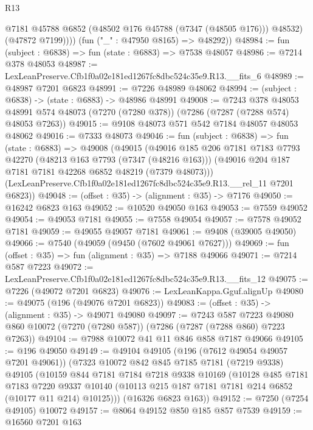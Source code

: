 \begin{lexlean}{R13}
\begin{coremodule}
              @7181
              @45788
              @6852
              (@48502 @176 @45788 (@7347 (@48505 @176)))
              @48532)
            (@47872 @7199))))
      (fun ("_" : @47950 @8165) => @48292))
@48984 := fun (subject : @6838) => fun (state : @6883) => @7538 @48057
@48986 := @7214 @378 @48053
@48987 := LexLeanPreserve.Cfb1f0a02e181ed1267fc8dbc524c35e9.R13.__fits_6
@48989 := @48987 @7201 @6823
@48991 := @7226 @48989 @48062
@48994 := (subject : @6838) -> (state : @6883) -> @48986 @48991
@49008 := @7243
    @378
    @48053
    @48991
    @574
    @48073
    (@7270 (@7280 @378))
    (@7286 (@7287 (@7288 @574) @48053 @7263))
@49015 := @9108 @48073 @571 @542 @7184 @48057 @48053 @48062
@49016 := @7333 @48073
@49046 := fun (subject : @6838) =>
  fun (state : @6883) =>
  @49008
    (@49015
      (@49016
        @185
        @206
        @7181
        @7183
        @7793
        @42270
        (@48213 @163 @7793 (@7347 (@48216 @163)))
        (@49016 @204 @187 @7181 @7181 @42268 @6852 @48219 (@7379 @48073)))
      (LexLeanPreserve.Cfb1f0a02e181ed1267fc8dbc524c35e9.R13.__rel_11 @7201 @6823))
@49048 := (offset : @35) -> (alignment : @35) -> @7176
@49050 := @16242 @6823 @163
@49052 := @10520 @49050 @163
@49053 := @7559 @49052
@49054 := @49053 @7181
@49055 := @7558 @49054
@49057 := @7578 @49052 @7181
@49059 := @49055 @49057 @7181
@49061 := @9408 (@39005 @49050)
@49066 := @7540 (@49059 (@9450 (@7602 @49061 @7627)))
@49069 := fun (offset : @35) => fun (alignment : @35) => @7188 @49066
@49071 := @7214 @587 @7223
@49072 := LexLeanPreserve.Cfb1f0a02e181ed1267fc8dbc524c35e9.R13.__fits_12
@49075 := @7226 (@49072 @7201 @6823)
@49076 := LexLeanKappa.Gguf.alignUp
@49080 := @49075 (@196 (@49076 @7201 @6823))
@49083 := (offset : @35) -> (alignment : @35) -> @49071 @49080
@49097 := @7243
    @587
    @7223
    @49080
    @860
    @10072
    (@7270 (@7280 @587))
    (@7286 (@7287 (@7288 @860) @7223 @7263))
@49104 := @7988 @10072 @41 @11 @846 @858 @7187 @49066
@49105 := @196 @49050
@49149 := @49104
    @49105
    (@196 (@7612 @49054 @49057 @7201 @49061))
    (@7323
      @10072
      @842
      @845
      @7185
      @7181
      (@7219 @9338)
      @49105
      (@10159
        @844
        @7181
        @7184
        @7218
        @9338
        @10169
        (@10128
          @485
          @7181
          @7183
          @7220
          @9337
          @10140
          (@10113 @215 @187 @7181 @7181 @214 @6852 (@10177 @11 @214) @10125)))
      (@16326 @6823 @163))
@49152 := @7250 (@7254 @49105) @10072
@49157 := @8064 @49152 @850 @185 @857 @7539
@49159 := @16560 @7201 @163

\end{coremodule}
\end{lexlean}
